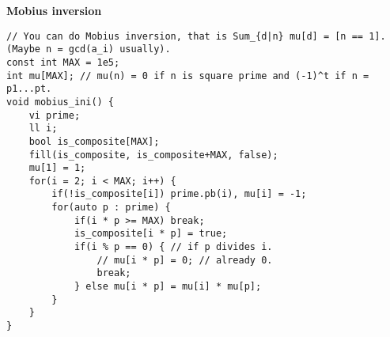 \documentclass[a4paper,10pt]{article}
\newcommand{\titleAlg}[1]{\vspace{-10pt}
\begin{center}\textbf{#1}\end{center} \vspace{-10pt}}
\begin{document}
\titleAlg{Mobius inversion}
\begin{multicols}{2}
\begin{verbatim}
// You can do Mobius inversion, that is Sum_{d|n} mu[d] = [n == 1]. (Maybe n = gcd(a_i) usually).
const int MAX = 1e5;
int mu[MAX]; // mu(n) = 0 if n is square prime and (-1)^t if n = p1...pt. 
void mobius_ini() {
    vi prime;
    ll i;
    bool is_composite[MAX];
    fill(is_composite, is_composite+MAX, false);
    mu[1] = 1;
    for(i = 2; i < MAX; i++) {
        if(!is_composite[i]) prime.pb(i), mu[i] = -1;
        for(auto p : prime) {
            if(i * p >= MAX) break;
            is_composite[i * p] = true;
            if(i % p == 0) { // if p divides i.
                // mu[i * p] = 0; // already 0.
                break;
            } else mu[i * p] = mu[i] * mu[p];
        }
    }
}

\end{verbatim}
\end{multicols}
\end{document}
